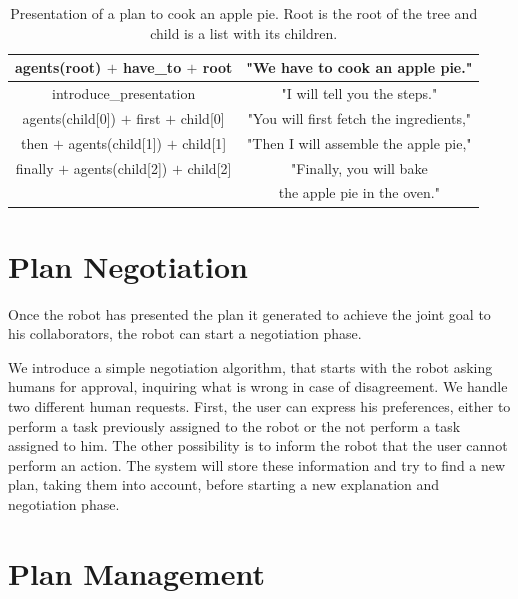  
 \begin{table}
\centering
\scriptsize
\renewcommand{\arraystretch}{1.3}
\begin{tabular}{c|c}
   agents(root) $+$ have\_to $+$ root  & "We have to cook an apple pie." \\
   \hline
   introduce\_presentation & "I will tell you the steps." \\
   \hline
   agents(child[0]) $+$ first $+$ child[0] & "You will first fetch the ingredients," \\
   \hline
   then $+$ agents(child[1]) $+$  child[1] & "Then I will assemble the apple pie," \\
   \hline
   finally $+$ agents(child[2]) $+$  child[2] & "Finally, you will bake \\
   & the apple pie in the oven." \\
\end{tabular}
 \vspace{-4pt}
\caption{Presentation of a plan to cook an apple pie. Root is the root of the tree and child is a list with its children.}
 \vspace{-20pt}
 \label{table:plan_management-pie-present}    
\end{table}

\section{Plan Negotiation}
\label{plan_managemet-plan_negotiation}
Once the robot has presented the plan it generated to achieve the joint goal to his collaborators, the robot can start a negotiation phase. 

We introduce a simple negotiation algorithm, that starts with the robot asking humans for approval, inquiring what is wrong in case of disagreement. We handle two different human requests. First, the user can express his preferences, either to perform a task previously assigned to the robot or the not perform a task assigned to him. The other possibility is to inform the robot that the user cannot perform an action. The system will store these information and try to find a new plan, taking them into account, before starting a new explanation and negotiation phase.
 
\section{Plan Management}
\label{sec:plan_management-planExecution}

